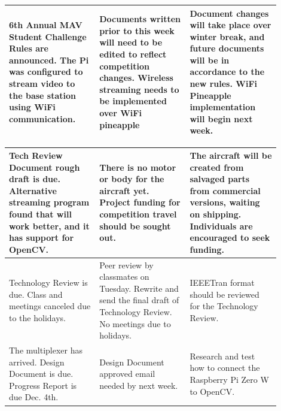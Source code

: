 \documentclass[onecolumn, draftclsnofoot,10pt, compsoc]{IEEEtran}
\begin{document}
\begin{center}
\begin{tabular}{|p{0.3\linewidth}|p{0.3\linewidth}|p{0.3\linewidth}|}
		\hline 
         6th Annual MAV Student Challenge Rules are announced. The Pi was configured to stream video to the base station using WiFi communication. & Documents written prior to this week will need to be edited to reflect competition changes. Wireless streaming needs to be implemented over WiFi pineapple & Document changes will take place over winter break, and future documents will be in accordance to the new rules. WiFi Pineapple implementation will begin next week. \\
		\hline
    \end{tabular}
\end{center}

\begin{center}
    \begin{tabular}{|p{0.3\linewidth}|p{0.3\linewidth}|p{0.3\linewidth}|}
        		\hline 
        Tech Review Document rough draft is due. Alternative streaming program found that will work better, and it has support for OpenCV. & There is no motor or body for the aircraft yet. Project funding for competition travel should be sought out. & The aircraft will be created from salvaged parts from commercial versions, waiting on shipping. Individuals are encouraged to seek funding. \\
		\hline 
         Technology Review is due. Class and meetings canceled due to the holidays. & Peer review by classmates on Tuesday. Rewrite and send the final draft of Technology Review. No meetings due to holidays. & IEEETran format should be reviewed for the Technology Review.\\
		\hline 
         The multiplexer has arrived. Design Document is due. Progress Report is due Dec. 4th. & Design Document approved email needed by next week. & Research and test how to connect the Raspberry Pi Zero W to OpenCV.   \\
        
        \hline
            \end{tabular}
\end{center}
\end{document}
